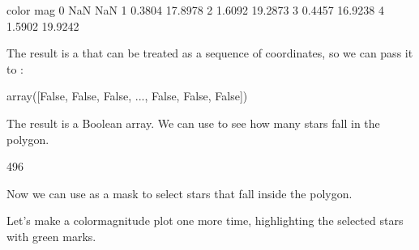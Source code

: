 \documentclass[letterpaper,10pt,english]{sphinxmanual}
\begin{document}
\begin{sphinxVerbatim}[commandchars=\\\{\}]
    color      mag
0     NaN      NaN
1  0.3804  17.8978
2  1.6092  19.2873
3  0.4457  16.9238
4  1.5902  19.9242
\end{sphinxVerbatim}

The result is a  that can be treated as a sequence of coordinates, so we can pass it to :

\begin{sphinxVerbatim}[commandchars=\\\{\}]
  
\end{sphinxVerbatim}

\begin{sphinxVerbatim}[commandchars=\\\{\}]
array([False, False, False, ..., False, False, False])
\end{sphinxVerbatim}

The result is a Boolean array.  We can use  to see how many stars fall in the polygon.

\begin{sphinxVerbatim}[commandchars=\\\{\}]
\end{sphinxVerbatim}

\begin{sphinxVerbatim}[commandchars=\\\{\}]
496
\end{sphinxVerbatim}

Now we can use  as a mask to select stars that fall inside the polygon.

\begin{sphinxVerbatim}[commandchars=\\\{\}]
  \PYG{p}{[}\PYG{p}{]}
\end{sphinxVerbatim}

Let’s make a color\sphinxhyphen{}magnitude plot one more time, highlighting the selected stars with green  marks.

\begin{sphinxVerbatim}[commandchars=\\\{\}]
 

\PYG{p}{[}\PYG{p}{]} \PYG{p}{[}\PYG{p}{]} 
\end{sphinxVerbatim}
\end{document}
